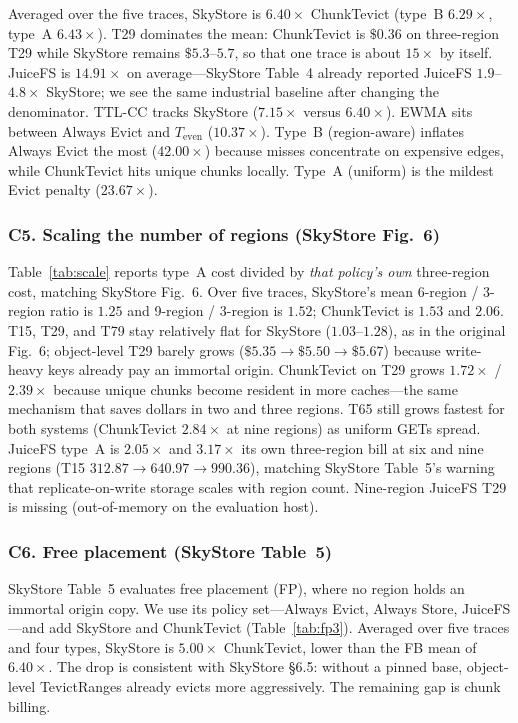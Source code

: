 Averaged over the five traces, SkyStore is $6.40\times$ ChunkTevict (type~B $6.29\times$, type~A $6.43\times$).
{T}29 dominates the mean: ChunkTevict is $\$0.36$ on three-region {T}29 while SkyStore remains $\$5.3$--$5.7$, so that one trace is about $15\times$ by itself.
JuiceFS is $14.91\times$ on average---SkyStore Table~4 already reported JuiceFS $1.9$--$4.8\times$ SkyStore; we see the same industrial baseline after changing the denominator.
{TTL}-{CC} tracks SkyStore ($7.15\times$ versus $6.40\times$).
{EWMA} sits between Always Evict and $T_{\mathrm{even}}$ ($10.37\times$).
Type~B (region-aware) inflates Always Evict the most ($42.00\times$) because misses concentrate on expensive edges, while ChunkTevict hits unique chunks locally.
Type~A (uniform) is the mildest Evict penalty ($23.67\times$).

\subsubsection{C5. Scaling the number of regions (SkyStore Fig.~6)}
\label{sec:eval-scale}

Table~\ref{tab:scale} reports type~A cost divided by \emph{that policy's own} three-region cost, matching SkyStore Fig.~6.
Over five traces, SkyStore's mean 6-region / 3-region ratio is $1.25$ and 9-region / 3-region is $1.52$; ChunkTevict is $1.53$ and $2.06$.
{T}15, {T}29, and {T}79 stay relatively flat for SkyStore ($1.03$--$1.28$), as in the original Fig.~6; object-level {T}29 barely grows ($\$5.35\rightarrow\$5.50\rightarrow\$5.67$) because write-heavy keys already pay an immortal origin.
ChunkTevict on {T}29 grows $1.72\times$ / $2.39\times$ because unique chunks become resident in more caches---the same mechanism that saves dollars in two and three regions.
{T}65 still grows fastest for both systems (ChunkTevict $2.84\times$ at nine regions) as uniform {GET}s spread.
JuiceFS type~A is $2.05\times$ and $3.17\times$ its own three-region bill at six and nine regions ({T}15 $312.87\rightarrow 640.97\rightarrow 990.36$), matching SkyStore Table~5's warning that replicate-on-write storage scales with region count.
Nine-region JuiceFS {T}29 is missing (out-of-memory on the evaluation host).

\subsubsection{C6. Free placement (SkyStore Table~5)}
\label{sec:eval-fp}

SkyStore Table~5 evaluates free placement ({FP}), where no region holds an immortal origin copy.
We use its policy set---Always Evict, Always Store, JuiceFS---and add SkyStore and ChunkTevict (Table~\ref{tab:fp3}).
Averaged over five traces and four types, SkyStore is $5.00\times$ ChunkTevict, lower than the {FB} mean of $6.40\times$.
The drop is consistent with SkyStore §6.5: without a pinned base, object-level TevictRanges already evicts more aggressively.
The remaining gap is chunk billing.

